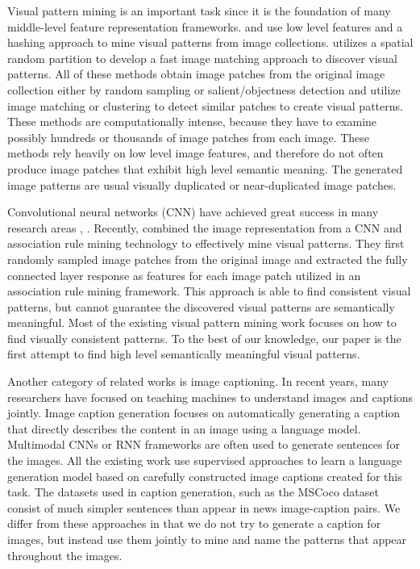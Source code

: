 \documentclass[10pt,twocolumn,letterpaper]{article}
\begin{document}
Visual pattern mining is an important task since it is the foundation of many middle-level feature representation frameworks.
\cite{han2000mining} and \cite{zhang2014scalable} use low level features and a hashing approach to mine visual patterns from image collections.
\cite{yuan2007spatial} utilizes a spatial random partition to develop a fast image matching approach to discover visual patterns.
All of these methods obtain image patches from the original image collection either by random sampling or salient/objectness detection and utilize image matching or clustering to detect similar patches to create visual patterns.
These methods are computationally intense, because they have to examine possibly hundreds or thousands of image patches from each image.
These methods rely heavily on low level image features, and therefore do not often produce image patches that exhibit high level semantic meaning.
The generated image patterns are usual visually duplicated or near-duplicated image patches.

Convolutional neural networks (CNN) have achieved great success in many research areas \cite{Simonyan14c}, \cite{Alexnet}.
Recently, \cite{LiLSH15CVPR} combined the image representation from a CNN and association rule mining technology to effectively mine visual patterns.
They first randomly sampled image patches from the original image and extracted the fully connected layer response as features for each image patch utilized in an association rule mining framework.
This approach is able to find consistent visual patterns, but cannot guarantee the discovered visual patterns are semantically meaningful.
Most of the existing visual pattern mining work focuses on how to find visually consistent patterns.
To the best of our knowledge, our paper is the first attempt to find high level semantically meaningful visual patterns.

Another category of related works is image captioning.
In recent years, many researchers have focused on teaching machines to understand images and captions jointly.
Image caption generation focuses on automatically generating a caption that directly describes the content in an image using a language model.
Multimodal CNNs \cite{frome2013devise} or RNN \cite{mao2014explain} frameworks are often used to generate sentences for the images.
All the existing work use supervised approaches to learn a language generation model based on carefully constructed image captions created for this task.
The datasets used in caption generation, such as the MSCoco dataset \cite{MSCoco} consist of much simpler sentences than appear in news image-caption pairs.
We differ from these approaches in that we do not try to generate a caption for images, but instead use them jointly to mine and name the patterns that appear throughout the images.
\end{document}
